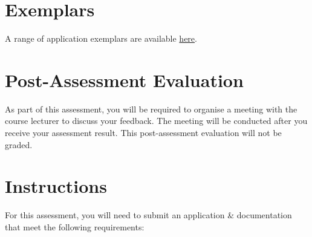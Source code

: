 \documentclass{article}
\begin{document}
\section*{Exemplars}
A range of application exemplars are available \href{}{here}.

\section*{Post-Assessment Evaluation}
As part of this assessment, you will be required to organise a meeting with the course lecturer to discuss your feedback. The meeting will be conducted after you receive your assessment result. This post-assessment evaluation will not be graded.

\newpage

\section*{Instructions} 
For this assessment, you will need to submit an application \& documentation that meet the following requirements:
\end{document}
